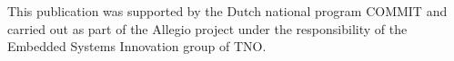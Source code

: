 \documentclass[smallextended]{svjour3}
\begin{document}
\begin{acknowledgements}
This publication was supported by the Dutch national program COMMIT and carried out as part of the Allegio project 
under the responsibility of the Embedded Systems Innovation group of TNO.
\end{acknowledgements}


















%
\end{document}
